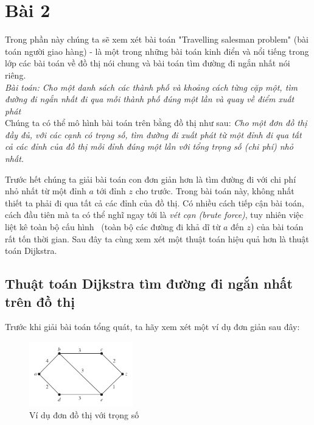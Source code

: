 
\section{Bài 2}
Trong phần này chúng ta sẽ xem xét bài toán "Travelling salesman problem" (bài toán 
người giao hàng) - là một trong những bài toán kinh điển và nổi tiếng trong lớp các
bài toán về đồ thị nói chung và bài toán tìm đường đi ngắn nhất nói riêng. \\

\textit{Bài toán: Cho một danh sách các thành phố và khoảng cách từng cặp một, 
tìm đường đi ngắn nhất đi qua mỗi thành phố đúng một lần và quay về điểm xuất phát} \\


Chúng ta có thể mô hình bài toán trên bằng đồ thị như sau: \textit{Cho một đơn đồ thị đầy đủ, 
với các cạnh có trọng số, tìm đường đi xuất phát từ một đỉnh đi qua tất cả các đỉnh 
của đồ thị mỗi đỉnh đúng một lần với tổng trọng số (chi phí) nhỏ nhất.}

Trước hết chúng ta giải bài toán con đơn giản hơn là tìm đường đi với chi phí nhỏ nhất từ
một đỉnh $a$ tới đỉnh $z$ cho trước. Trong bài toán này, không nhất thiết ta phải đi qua 
tất cả các đỉnh của đồ thị. Có nhiều cách tiếp cận bài toán, cách đầu tiên mà ta có thể nghĩ 
ngay tới là \textit{vét cạn (brute force)}, tuy nhiên việc liệt kê toàn bộ cấu hình \
(toàn bộ các đường đi khả dĩ từ $a$ đến $z$) của bài toán rất tốn thời gian. Sau đây ta cùng
xem xét một thuật toán hiệu quả hơn là thuật toán Dijkstra.

\subsection{Thuật toán Dijkstra tìm đường đi ngắn nhất trên đồ thị}
Trước khi giải bài toán tổng quát, ta hãy xem xét một ví dụ đơn giản sau đây:

\begin{figure}[H] %
    \centering %
    \includegraphics[width=0.4\textwidth]{assets/gr_01.png} 
    \caption{Ví dụ đơn đồ thị với trọng số } %
    \label{fig:gr_01}
\end{figure}

